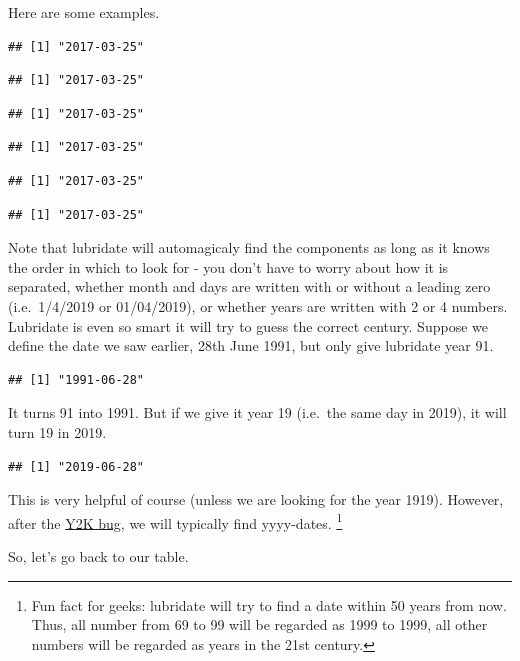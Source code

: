 \documentclass[]{tufte-book}
\begin{document}
Here are some examples.

\begin{verbatim}
## [1] "2017-03-25"
\end{verbatim}

\begin{verbatim}
## [1] "2017-03-25"
\end{verbatim}

\begin{verbatim}
## [1] "2017-03-25"
\end{verbatim}

\begin{verbatim}
## [1] "2017-03-25"
\end{verbatim}

\begin{verbatim}
## [1] "2017-03-25"
\end{verbatim}

\begin{verbatim}
## [1] "2017-03-25"
\end{verbatim}

Note that lubridate will automagicaly find the components as long as it knows the order in which to look for - you don't have to worry about how it is separated, whether month and days are written with or without a leading zero (i.e.~1/4/2019 or 01/04/2019), or whether years are written with 2 or 4 numbers. Lubridate is even so smart it will try to guess the correct century. Suppose we define the date we saw earlier, 28th June 1991, but only give lubridate year 91.

\begin{verbatim}
## [1] "1991-06-28"
\end{verbatim}

It turns 91 into 1991. But if we give it year 19 (i.e.~the same day in 2019), it will turn 19 in 2019.

\begin{verbatim}
## [1] "2019-06-28"
\end{verbatim}

This is very helpful of course (unless we are looking for the year 1919). However, after the \href{https://www.britannica.com/technology/Y2K-bug}{Y2K bug}, we will typically find yyyy-dates. \footnote{Fun fact for geeks: lubridate will try to find a date within 50 years from now. Thus, all number from 69 to 99 will be regarded as 1999 to 1999, all other numbers will be regarded as years in the 21st century.}

So, let's go back to our table.
\end{document}
